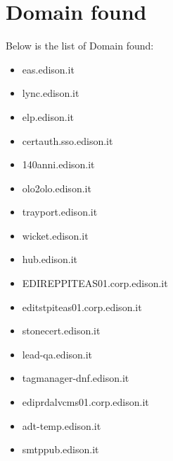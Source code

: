\documentclass{article}
\begin{document}
\clearpage

\section{Domain found}

Below is the list of Domain found:

\begin{itemize}
    
        
            \item eas.edison.it
        
            \item lync.edison.it
        
            \item elp.edison.it
        
            \item certauth.sso.edison.it
        
            \item 140anni.edison.it
        
            \item olo2olo.edison.it
        
            \item trayport.edison.it
        
            \item wicket.edison.it
        
            \item hub.edison.it
        
            \item EDIREPPITEAS01.corp.edison.it
        
            \item editstpiteas01.corp.edison.it
        
            \item stonecert.edison.it
        
            \item lead-qa.edison.it
        
            \item tagmanager-dnf.edison.it
        
            \item ediprdalvcms01.corp.edison.it
        
            \item adt-temp.edison.it
        
            \item smtppub.edison.it
        

\end{itemize}
\end{document}
